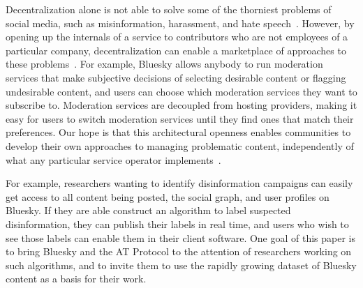 \documentclass[sigconf,nonacm]{acmart}
\begin{document}
Decentralization alone is not able to solve some of the thorniest problems of social media, such as misinformation, harassment, and hate speech~\cite{Roth:2023}.
However, by opening up the internals of a service to contributors who are not employees of a particular company, decentralization can enable a marketplace of approaches to these problems~\cite{Masnick:2019}.
For example, Bluesky allows anybody to run moderation services that make subjective decisions of selecting desirable content or flagging undesirable content, and users can choose which moderation services they want to subscribe to.
Moderation services are decoupled from hosting providers, making it easy for users to switch moderation services until they find ones that match their preferences.
Our hope is that this architectural openness enables communities to develop their own approaches to managing problematic content, independently of what any particular service operator implements~\cite{Masnick:2019}.

For example, researchers wanting to identify disinformation campaigns can easily get access to all content being posted, the social graph, and user profiles on Bluesky.
If they are able construct an algorithm to label suspected disinformation, they can publish their labels in real time, and users who wish to see those labels can enable them in their client software.
One goal of this paper is to bring Bluesky and the AT Protocol to the attention of researchers working on such algorithms, and to invite them to use the rapidly growing dataset of Bluesky content as a basis for their work.
\end{document}
